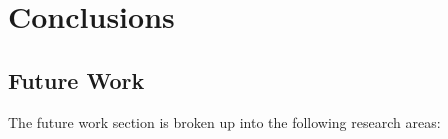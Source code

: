 \newpage
\chapter*{Conclusions}




%
%
\section*{Future Work}

The future work section is broken up into the following research areas:
 

